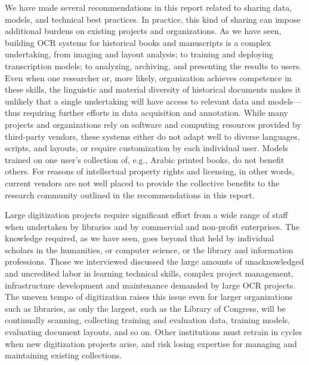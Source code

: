 \documentclass[twoside,11pt]{report}
\begin{document}
We have made several recommendations in this report related to sharing data, models, and technical best practices. In practice, this kind of sharing can impose additional burdens on existing projects and organizations. As we have seen, building OCR systems for historical books and manuscripts is a complex undertaking, from imaging and layout analysis; to training and deploying transcription models; to analyzing, archiving, and presenting the results to users. Even when one researcher or, more likely, organization achieves competence in these skills, the linguistic and material diversity of historical documents makes it unlikely that a single undertaking will have access to relevant data and models---thus requiring further efforts in data acquisition and annotation. While many projects and organizations rely on software and computing resources provided by third-party vendors, these systems either do not adapt well to diverse languages, scripts, and layouts, or require customization by each individual user. Models trained on one user's collection of, e.g., Arabic printed books, do not benefit others. For reasons of intellectual property rights and licensing, in other words, current vendors are not well placed to provide the collective benefits to the research community outlined in the recommendations in this report.

Large digitization projects require significant effort from a wide range of staff when undertaken by libraries and by commercial and non-profit enterprises. The knowledge required, as we have seen, goes beyond that held by individual scholars in the humanities, or computer science, or the library and information professions. Those we interviewed discussed the large amounts of unacknowledged and uncredited labor in learning technical skills, complex project management, infrastructure development and maintenance demanded by large OCR projects. The uneven tempo of digitization raises this issue even for larger organizations such as libraries, as only the largest, such as the Library of Congress, will be continually scanning, collecting training and evaluation data, training models, evaluating document layouts, and so on. Other institutions must retrain in cycles when new digitization projects arise, and risk losing expertise for managing and maintaining existing collections.
\end{document}
